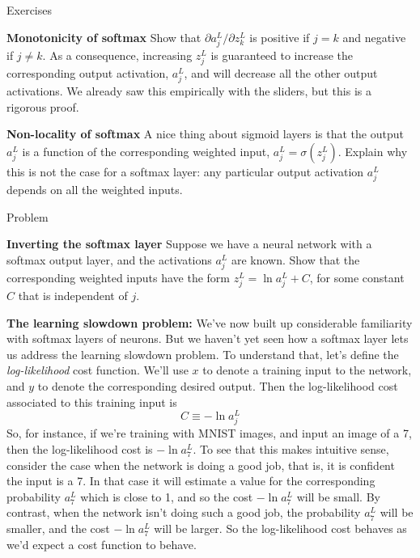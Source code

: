 \documentclass[a4paper,twoside,10pt]{book}
\begin{document}
\begin{exercize}{Exercises}
\item \textbf{Monotonicity of softmax} Show that $\partial a^L_j / \partial z^L_k $ is positive if $j=k$ and negative if $j\ne k$. As a consequence, increasing $z^L_j$ is guaranteed to increase the corresponding output activation, $a^L_j$, and will decrease all the other output activations. We already saw this empirically with the sliders, but this is a rigorous proof.
\item \textbf{Non-locality of softmax} A nice thing about sigmoid layers is that the output $a^L_j$ is a function of the corresponding weighted input, $a^L_j=\sigma(z^L_j)$. Explain why this is not the case for a softmax layer: any particular output activation $a^L_j$ depends on all the weighted inputs.
\end{exercize}

\begin{exercize}{Problem}
	\item \textbf{Inverting the softmax layer} Suppose we have a neural network with a softmax output layer, and the activations $a^L_j$ are known. Show that the corresponding weighted inputs have the form $z^L_j=\ln a^L_j+C$, for some constant $C$ that is independent of $j$.
\end{exercize}
\textbf{The learning slowdown problem:} We've now built up considerable familiarity with softmax layers of neurons. But we haven't yet seen how a softmax layer lets us address the learning slowdown problem. To understand that, let's define the \textit{log-likelihood} cost function. We'll use $x$ to denote a training input to the network, and $y$ to denote the corresponding desired output. Then the log-likelihood cost associated to this training input is
\begin{equation}
	C \equiv -\ln a^L_j
\label{eq:80}
\end{equation}
So, for instance, if we're training with MNIST images, and input an image of a 7, then the log-likelihood cost is $-\ln a^L_7$. To see that this makes intuitive sense, consider the case when the network is doing a good job, that is, it is confident the input is a 7. In that case it will estimate a value for the corresponding probability $a^L_7$ which is close to 1, and so the cost $-\ln a^L_7$ will be small. By contrast, when the network isn't doing such a good job, the probability $a^L_7$ will be smaller, and the cost $-\ln a^L_7$ will be larger. So the log-likelihood cost behaves as we'd expect a cost function to behave.
\end{document}
